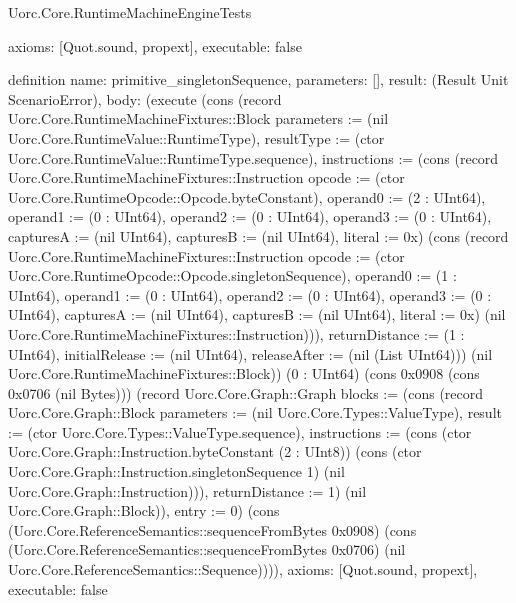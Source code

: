 \begin{lexlean}{Uorc.Core.RuntimeMachineEngineTests}
\begin{semanticmodule}
{  axioms: [Quot.sound, propext],
  executable: false
}

definition{
  name: primitive_singletonSequence,
  parameters: [],
  result: (Result Unit ScenarioError),
  body: (execute (cons (record Uorc.Core.RuntimeMachineFixtures::Block {parameters := (nil Uorc.Core.RuntimeValue::RuntimeType), resultType := (ctor Uorc.Core.RuntimeValue::RuntimeType.sequence), instructions := (cons (record Uorc.Core.RuntimeMachineFixtures::Instruction {opcode := (ctor Uorc.Core.RuntimeOpcode::Opcode.byteConstant), operand0 := (2 : UInt64), operand1 := (0 : UInt64), operand2 := (0 : UInt64), operand3 := (0 : UInt64), capturesA := (nil UInt64), capturesB := (nil UInt64), literal := 0x}) (cons (record Uorc.Core.RuntimeMachineFixtures::Instruction {opcode := (ctor Uorc.Core.RuntimeOpcode::Opcode.singletonSequence), operand0 := (1 : UInt64), operand1 := (0 : UInt64), operand2 := (0 : UInt64), operand3 := (0 : UInt64), capturesA := (nil UInt64), capturesB := (nil UInt64), literal := 0x}) (nil Uorc.Core.RuntimeMachineFixtures::Instruction))), returnDistance := (1 : UInt64), initialRelease := (nil UInt64), releaseAfter := (nil (List UInt64))}) (nil Uorc.Core.RuntimeMachineFixtures::Block)) (0 : UInt64) (cons 0x0908 (cons 0x0706 (nil Bytes))) (record Uorc.Core.Graph::Graph {blocks := (cons (record Uorc.Core.Graph::Block {parameters := (nil Uorc.Core.Types::ValueType), result := (ctor Uorc.Core.Types::ValueType.sequence), instructions := (cons (ctor Uorc.Core.Graph::Instruction.byteConstant (2 : UInt8)) (cons (ctor Uorc.Core.Graph::Instruction.singletonSequence 1) (nil Uorc.Core.Graph::Instruction))), returnDistance := 1}) (nil Uorc.Core.Graph::Block)), entry := 0}) (cons (Uorc.Core.ReferenceSemantics::sequenceFromBytes 0x0908) (cons (Uorc.Core.ReferenceSemantics::sequenceFromBytes 0x0706) (nil Uorc.Core.ReferenceSemantics::Sequence)))),
  axioms: [Quot.sound, propext],
  executable: false
}


\end{semanticmodule}
\end{lexlean}
